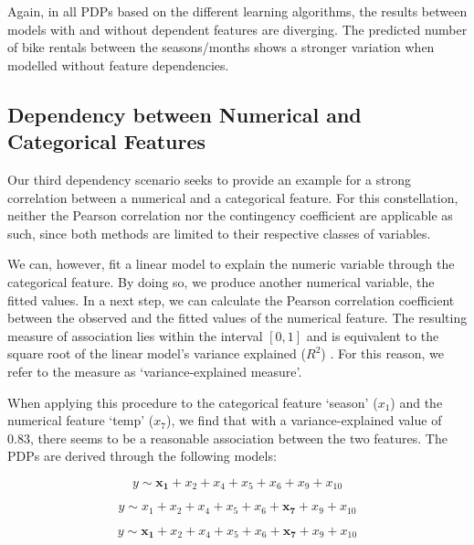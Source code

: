 \documentclass[]{krantz}
\begin{document}
Again, in all PDPs based on the different learning algorithms, the
results between models with and without dependent features are
diverging. The predicted number of bike rentals between the
seasons/months shows a stronger variation when modelled without feature
dependencies.

\subsection{Dependency between Numerical and Categorical
Features}\label{NumCat}

Our third dependency scenario seeks to provide an example for a strong
correlation between a numerical and a categorical feature. For this
constellation, neither the Pearson correlation nor the contingency
coefficient are applicable as such, since both methods are limited to
their respective classes of variables.

We can, however, fit a linear model to explain the numeric variable
through the categorical feature. By doing so, we produce another
numerical variable, the fitted values. In a next step, we can calculate
the Pearson correlation coefficient between the observed and the fitted
values of the numerical feature. The resulting measure of association
lies within the interval \([0,1]\) and is equivalent to the square root
of the linear model's variance explained (\(R^2\))
\citep{fahrmeir2013regression}. For this reason, we refer to the measure
as `variance-explained measure'.

When applying this procedure to the categorical feature `season'
(\(x_1\)) and the numerical feature `temp' (\(x_7\)), we find that with
a variance-explained value of 0.83, there seems to be a reasonable
association between the two features. The PDPs are derived through the
following models:

\begin{equation}
y \sim \mathbf{x_1} + x_2 + x_4 + x_5 + x_6 + x_9 + x_{10} \label{eq:7}
\end{equation}

\begin{equation}
y \sim x_1 + x_2 + x_4 + x_5 + x_6 + \mathbf{x_7}+ x_9 + x_{10} \label{eq:8}
\end{equation}

\begin{equation}
y \sim \mathbf{x_1} + x_2  + x_4 + x_5 + x_6 +\mathbf{x_7}+ x_9 + x_{10} \label{eq:9}
\end{equation}
\end{document}
